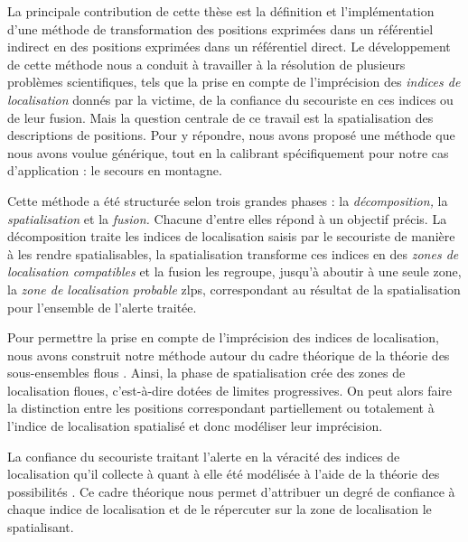 
La principale contribution de cette thèse est la définition et
l'implémentation d'une méthode de transformation des positions
exprimées dans un référentiel indirect en des positions exprimées dans
un référentiel direct. Le développement de cette méthode nous a
conduit à travailler à la résolution de plusieurs problèmes
scientifiques, tels que la prise en compte de l'imprécision des
\emph{indices de localisation} donnés par la victime, de la confiance
du secouriste en ces indices ou de leur fusion. Mais la question
centrale de ce travail est la spatialisation des descriptions de
positions. Pour y répondre, nous avons proposé une méthode que nous
avons voulue générique, tout en la calibrant spécifiquement pour notre
cas d’application : le secours en montagne.

Cette méthode a été structurée selon trois grandes phases : la
\emph{décomposition,} la \emph{spatialisation} et la \emph{fusion.}
Chacune d'entre elles répond à un objectif précis. La décomposition
traite les indices de localisation saisis par le secouriste de manière
à les rendre spatialisables, la spatialisation transforme ces indices
en des \emph{zones de localisation compatibles} et la fusion les
regroupe, jusqu'à aboutir à une seule zone, la \emph{zone de
  localisation probable} \acp{zlp}, correspondant au résultat de la
spatialisation pour l'ensemble de l'alerte traitée.

Pour permettre la prise en compte de l'imprécision des indices de
localisation, nous avons construit notre méthode autour du cadre
théorique de la théorie des sous-ensembles flous
\autocite{Zadeh1965}. Ainsi, la phase de spatialisation crée des zones
de localisation floues, c'est-à-dire dotées de limites
progressives. On peut alors faire la distinction entre les positions
correspondant partiellement ou totalement à l'indice de localisation
spatialisé et donc modéliser leur imprécision. 

La confiance du secouriste traitant l'alerte en la véracité des
indices de localisation qu'il collecte à quant à elle été modélisée à
l'aide de la théorie des possibilités \autocite{Zadeh1978}. Ce cadre
théorique nous permet d'attribuer un degré de confiance à chaque
indice de localisation et de le répercuter sur la zone de localisation
le spatialisant.

